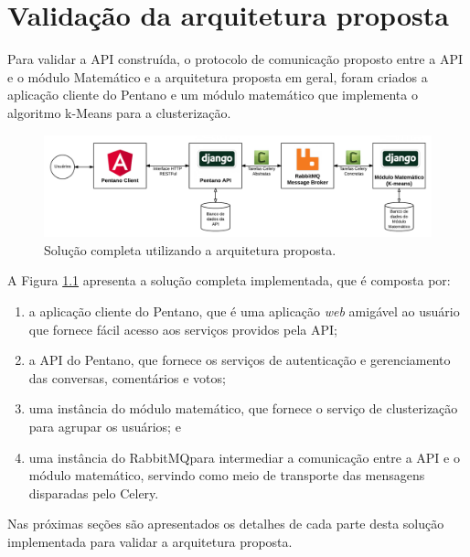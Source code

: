 \chapter{Validação da arquitetura proposta} \label{cap:aplicacao_exemplo}

  Para validar a API construída, o protocolo de comunicação proposto entre a API e o módulo Matemático
  e a arquitetura proposta em geral, foram criados a aplicação cliente do Pentano e um módulo matemático
  que implementa o algoritmo k-Means para a clusterização.
  
  \begin{figure}[h!]
    \centering
    \includegraphics[scale=0.3]{figuras/whole_solution.png}
    \caption{Solução completa utilizando a arquitetura proposta.}
    \label{fig:whole_solution}
  \end{figure}
  
  A Figura \ref{fig:whole_solution} apresenta a solução completa implementada, que
  é composta por:
  
  \begin{enumerate}
      \item a aplicação cliente do Pentano, que é uma aplicação \textit{web} amigável ao usuário que fornece 
      fácil acesso aos serviços providos pela API;
      \item a API do Pentano, que fornece os serviços de autenticação e gerenciamento das conversas, comentários e votos; 
      \item uma instância do módulo matemático,
	  que fornece o serviço de clusterização para agrupar os usuários; e
      \item uma instância do RabbitMQ\footnotemark para
	  intermediar a comunicação entre a API e o módulo matemático, servindo como meio de transporte das
	  mensagens disparadas pelo Celery.
  \end{enumerate}

  Nas próximas seções são apresentados os detalhes de cada parte desta solução implementada
  para validar a arquitetura proposta.
  
  

